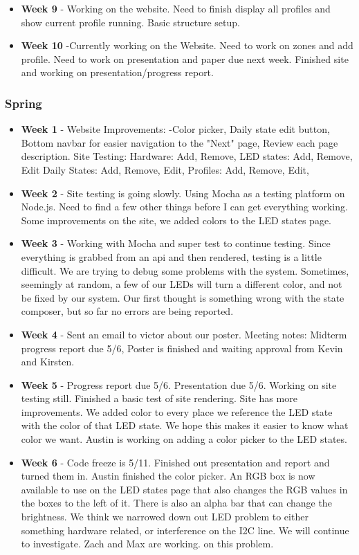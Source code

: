 \documentclass[onecolumn, draftclsnofoot,10pt, compsoc]{IEEEtran}
\begin{document}
\begin{itemize}
					\item \textbf{Week 9} - Working on the website. Need to finish display all profiles and show current profile running. Basic structure setup.
					\item \textbf{Week 10} -Currently working on the Website. Need to work on zones and add profile. Need to work on presentation and paper due next week. Finished site and working on presentation/progress report.
				\end{itemize}
			\subsubsection{Spring}
				\begin{itemize}
					\item \textbf{Week 1} - Website Improvements: -Color picker, Daily state edit button, Bottom navbar for easier navigation to the "Next" page, Review each page description. Site Testing: Hardware: Add, Remove, LED states: Add, Remove, Edit Daily States: Add, Remove, Edit, Profiles: Add, Remove, Edit,
					\item \textbf{Week 2} - Site testing is going slowly. Using Mocha as a testing platform on Node.js. Need to find a few other things before I can get everything working. Some improvements on the site, we added colors to the LED states page.
					\item \textbf{Week 3} - Working with Mocha and super test to continue testing.  Since everything is grabbed from an api and then rendered, testing is a little difficult. We are trying to debug some problems with the system. Sometimes, seemingly at random, a few of our LEDs will turn a different color, and not be fixed by our system. Our first thought is something wrong with the state composer, but so far no errors are being reported.
					\item \textbf{Week 4} - Sent an email to victor about our poster. Meeting notes:  Midterm progress report due 5/6, Poster is finished and waiting approval from Kevin and Kirsten.
					\item \textbf{Week 5} - Progress report due 5/6. Presentation due 5/6. Working on site testing still. Finished a basic test of  site rendering. Site has more improvements. We added color to every place we reference the LED state with the color of that LED state. We hope this makes it easier to know what color we want. Austin is working on adding a color picker to the LED states.
					\item \textbf{Week 6} - Code freeze is 5/11. Finished out presentation and report and turned them in. Austin finished the color picker. An RGB box is now available to use on the LED states page that also changes the RGB values in the boxes to the left of it.  There is also an alpha bar that can change the brightness. We think we narrowed down out LED problem to either something hardware related, or interference on the I2C line. We will continue to investigate. Zach and Max are working. on this problem.

\end{itemize}
\end{document}
